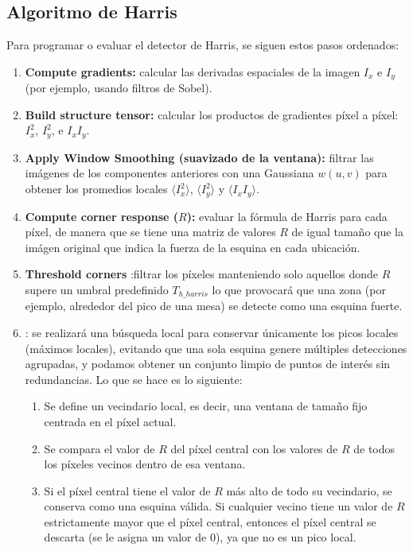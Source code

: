 \subsection{Algoritmo de Harris}
\noindent
Para programar o evaluar el detector de Harris, se siguen estos pasos ordenados:
\begin{enumerate}
    \item \textbf{Compute gradients:} calcular las derivadas espaciales de la imagen $I_x$ e $I_y$ (por ejemplo, usando filtros de Sobel).
    \item \textbf{Build structure tensor:} calcular los productos de gradientes píxel a píxel: $I_x^2$, $I_y^2$, e $I_x I_y$.
    \item \textbf{Apply Window Smoothing (suavizado de la ventana):} filtrar las imágenes de los componentes anteriores con una Gaussiana $w(u,v)$ para obtener los promedios locales $\langle I_x^2 \rangle$, $\langle I_y^2 \rangle$ y $\langle I_x I_y \rangle$.
    \item \textbf{Compute corner response ($R$):} evaluar la fórmula de Harris para cada píxel, de manera que se tiene una matriz de valores $R$ de igual tamaño que la imágen original que indica la fuerza de la esquina en cada ubicación.
    \item \textbf{Threshold corners} :filtrar los píxeles manteniendo solo aquellos donde $R$ supere un umbral predefinido $T_{h\_harris}$ lo que provocará que una zona (por ejemplo, alrededor del pico de una mesa) se detecte como una esquina fuerte.
    \item {}: se realizará una búsqueda local para conservar únicamente los picos locales (máximos locales), evitando que una sola esquina genere múltiples detecciones agrupadas, y podamos obtener un conjunto limpio de puntos de interés sin redundancias. Lo que se hace es lo siguiente:
    \begin{enumerate}
        \item Se define un vecindario local, es decir, una ventana de tamaño fijo centrada en el píxel actual.
        \item Se compara el valor de $R$ del píxel central con los valores de $R$ de todos los píxeles vecinos dentro de esa ventana.
        \item Si el píxel central tiene el valor de $R$ más alto de todo su vecindario, se conserva como una esquina válida. Si cualquier vecino tiene un valor de $R$ estrictamente mayor que el píxel central, entonces el píxel central se descarta (se le asigna un valor de 0), ya que no es un pico local.
    \end{enumerate}
\end{enumerate}

